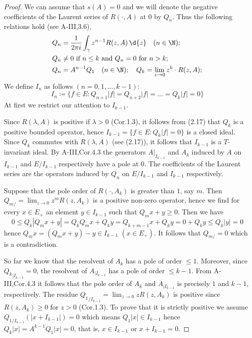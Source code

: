 \begin{proof}
	We can assume that $s(A) = 0$ and we will denote the negative coefficients of the Laurent series of $R(\cdot,A)$ at $0$ by $Q_{n}$.
	Thus the following relations hold (see A-III,3.6),
	\begin{equation}
	\begin{split}
		Q_{n} &= \frac{1}{2\pi i}\int_{\gamma} z^{n-1}R(z,A) \, \d{z} \quad (n \in \N); \\
		Q_{n} &\neq 0 \text{ if } n \leq k \text{ and } Q_{n} = 0 \text{ for } n > k; \\
		Q_{n} &= A^{n-1}Q_{1} \quad (n \in \N); \quad Q_{k} = \lim_{z \to 0}z^{k}\cdot R(z,A);
	\end{split}
	\end{equation}
	We define $I_{n}$ as follows $(n = 0,1,\ldots,k-1)$:
	\[
	I_{n} \coloneqq \{f \in E \colon Q_{n+1}|f| = Q_{n+2}|f| = \ldots = Q_{k}|f| = 0\}
	\]
	At first we restrict our attention to $I_{k-1}$.
	
	Since $R(\lambda,A)$ is positive if $\lambda > 0$ (Cor.1.3), it follows from (2.17) that $Q_{k}$ is a positive bounded operator, hence $I_{k-1} = \{f \in E \colon Q_{k}|f| = 0\}$ is a closed ideal.
	Since $Q_{k}$ commutes with $R(\lambda,A)$ (see (2.17)), it follows that $I_{k-1}$ is a $T$-invariant ideal.
	By A-III,Cor.4.3 the generators $A|_{I_{k-1}}$ and $A_{k}$ induced by $A$ on $I_{k-1}$ and $E/I_{k-1}$ respectively have a pole at $0$.
	The coefficients of the Laurent series are the operators induced by $Q_{n}$ on $E/I_{k-1}$ and $I_{k-1}$ respectively.
	
	Suppose that the pole order of $R(\cdot,A_{k})$ is greater than $1$, say $m$.
	Then $Q_{m/} = \lim_{z \to 0}z^{m}R(z,A_{k})$ is a positive non-zero operator, hence we find for every $x \in E_{+}$ an element $y \in I_{k-1}$ such that $Q_{m}x + y \geq 0$.
	Then we have
	\[
	0 \leq Q_{k}|Q_{m}x + y| = Q_{k}Q_{m}x + Q_{k}y = Q_{k+m-1}x + Q_{k}y = 0 + Q_{k}y \leq Q_{k}|y| = 0
	\]
	hence $Q_{m}x = (Q_{m}x + y) - y \in I_{k-1}$ $(x \in E_{+})$.
	It follows that $Q_{m/} = 0$ which is a contradiction.
	
	So far we know that the resolvent of $A_{k}$ has a pole of order $\leq 1$.
	Moreover, since ${Q_{k}}_{|I_{k-1}} = 0$, 
	the resolvent of $A_{|I_{k-1}}$ has a pole of order $\leq k-1$.
	From A-III,Cor.4.3 it follows that the pole order of $A_{k}$ and $A_{|I_{k-1}}$ is precisely $1$ and $k-1$, respectively.
	The residue ${Q_{1}}_{/I_{k-1}} = \lim_{z \to 0}zR(z,A_{k})$ is positive since $R(z,A_{k}) \geq 0$ for $z > 0$ (Cor.1.3).
	To prove that it is strictly positive we assume $Q_{1/I_{k-1}}(|x + I_{k-1}|) = 0$ which means $Q_{1}|x| \in I_{k-1}$ hence $Q_{k}|x| = A^{k-1}Q_{1}|x| = 0$, that is, $x \in I_{k-1}$ or $x + I_{k-1} = 0$.
	

\end{proof}
